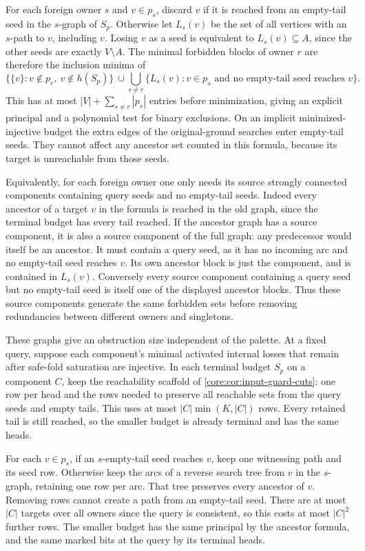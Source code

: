 For each foreign owner $s$ and $v\in p_s$, discard
$v$ if it is reached from an empty-tail seed in
the $s$-graph of $S_p$. Otherwise let $L_s(v)$
be the set of all vertices with an $s$-path to
$v$, including $v$. Losing $v$ as a seed is
equivalent to $L_s(v)\subseteq A$, since the
other seeds are exactly $V\setminus A$. The
minimal forbidden blocks of owner $r$ are
therefore the inclusion minima of
\[
 \bigl\{\{v\}:v\notin p_r,\ v\notin h(S_p)\bigr\}
 \ \cup\!
 \bigcup_{s\ne r}
 \bigl\{L_s(v):v\in p_s\text{ and no empty-tail
 seed reaches }v\bigr\}.
\]
This has at most $|V|+\sum_{s\ne r}|p_s|$
entries before minimization, giving an explicit
principal and a polynomial test for binary
exclusions. On an implicit minimized-injective
budget the extra edges of the original-ground
searches enter empty-tail seeds. They cannot
affect any ancestor set counted in this formula,
because its target is unreachable from those
seeds.

Equivalently, for each foreign owner one only needs
its source strongly connected components containing
query seeds and no empty-tail seeds. Indeed every
ancestor of a target $v$ in the formula is reached
in the old graph, since the terminal budget has
every tail reached. If the ancestor graph has a
source component, it is also a source component of
the full graph: any predecessor would itself be
an ancestor. It must contain a query seed, as it
has no incoming arc and no empty-tail seed reaches
$v$. Its own ancestor block is just the component,
and is contained in $L_s(v)$. Conversely every
source component containing a query seed but no
empty-tail seed is itself one of the displayed
ancestor blocks. Thus these source components
generate the same forbidden sets before removing
redundancies between different owners and singletons.

These graphs give an obstruction size independent
of the palette. At a fixed query, suppose each
component's minimal activated internal losses that
remain after safe-fold saturation are injective.
In each terminal budget $S_p$ on a
component $C$, keep the reachability scaffold of
\cref{core:cor:input-guard-cuts}: one row per head
and the rows needed to preserve all reachable
sets from the query seeds and empty tails. This
uses at most $|C|\min(K,|C|)$ rows. Every retained
tail is still reached, so the smaller budget is
already terminal and has the same heads.

For each $v\in p_s$, if an $s$-empty-tail seed
reaches $v$, keep one witnessing path and its
seed row. Otherwise keep the arcs of a reverse
search tree from $v$ in the $s$-graph, retaining
one row per arc. That tree preserves every
ancestor of $v$. Removing rows cannot create a
path from an empty-tail seed. There are at most
$|C|$ targets over all owners since the query
is consistent, so this costs at most $|C|^2$
further rows. The smaller budget has the same
principal by the ancestor formula, and the same
marked bits at the query by its terminal heads.

